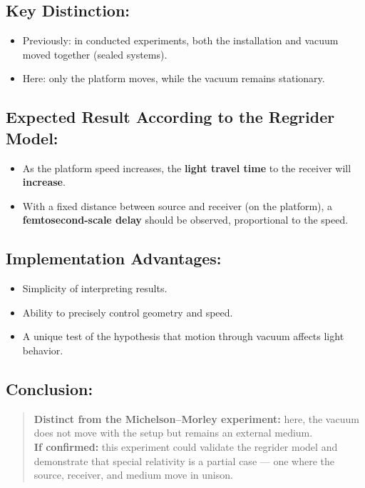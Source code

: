 \documentclass[12pt]{article}
\begin{document}
\subsection*{Key Distinction:}
\begin{itemize}
    \item Previously: in conducted experiments, both the installation and vacuum moved together (sealed systems).
    \item Here: only the platform moves, while the vacuum remains stationary.
\end{itemize}

\subsection*{Expected Result According to the Regrider Model:}
\begin{itemize}
    \item As the platform speed increases, the \textbf{light travel time} to the receiver will \textbf{increase}.
    \item With a fixed distance between source and receiver (on the platform), a \textbf{femtosecond-scale delay} should be observed, proportional to the speed.
\end{itemize}

\subsection*{Implementation Advantages:}
\begin{itemize}
    \item Simplicity of interpreting results.
    \item Ability to precisely control geometry and speed.
    \item A unique test of the hypothesis that motion through vacuum affects light behavior.
\end{itemize}

\subsection*{Conclusion:}
\begin{quote}
\textbf{Distinct from the Michelson–Morley experiment:} here, the vacuum does not move with the setup but remains an external medium.\\
\textbf{If confirmed:} this experiment could validate the regrider model and demonstrate that special relativity is a partial case — one where the source, receiver, and medium move in unison.
\end{quote}
\end{document}
